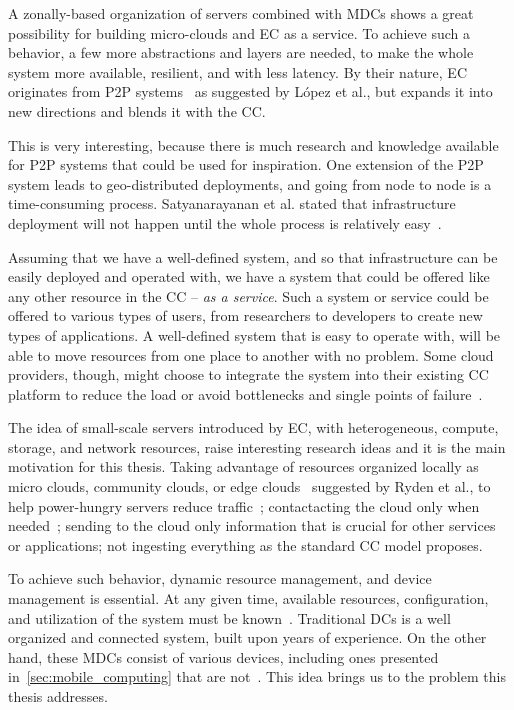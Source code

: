 A zonally-based organization of servers combined with MDCs shows a great possibility for building micro-clouds and EC as a service. To achieve such a behavior, a few more abstractions and layers are needed, to make the whole system more available, resilient, and with less latency. By their nature, EC originates from P2P systems~\cite{LopezMEDHIBFR15} as suggested by L{\'{o}}pez et al., but expands it into new directions and blends it with the CC. 

This is very interesting, because there is much research and knowledge available for P2P systems that could be used for inspiration. One extension of the P2P system leads to geo-distributed deployments, and going from node to node is a time-consuming process. Satyanarayanan et al. stated that infrastructure deployment will not happen until the whole process is relatively easy~\cite{SatyanarayananBCD09}. 

Assuming that we have a well-defined system, and so that infrastructure can be easily deployed and operated with, we have a system that could be offered like any other resource in the CC -- \emph{as a service}. Such a system or service could be offered to various types of users, from researchers to developers to create new types of applications. A well-defined system that is easy to operate with, will be able to move resources from one place to another with no problem. Some cloud providers, though, might choose to integrate the system into their existing CC platform to reduce the load or avoid bottlenecks and single points of failure~\cite{JararwehDAAAB16}.

The idea of small-scale servers introduced by EC, with heterogeneous, compute, storage, and network resources, raise interesting research ideas and it is the main motivation for this thesis. Taking advantage of resources organized locally as micro clouds, community clouds, or edge clouds~\cite{RydenOCW14} suggested by Ryden et al., to help power-hungry servers reduce traffic~\cite{HirschMZ18}; contactacting the cloud only when needed~\cite{inproceedingsSimic1}; sending to the cloud only information that is crucial for other services or applications; not ingesting everything as the standard CC model proposes.

To achieve such behavior, dynamic resource management, and device management is essential. At any given time, available resources, configuration, and utilization of the system must be known~\cite{GubbiBMP13, WangZZWYW17}. Traditional DCs is a well organized and connected system, built upon years of experience. On the other hand, these MDCs consist of various devices, including ones presented in~\ref{sec:mobile_computing} that are not~\cite{JiangCGZW19}. This idea brings us to the problem this thesis addresses.

